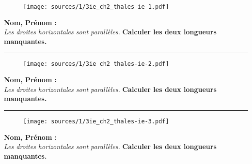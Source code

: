 \documentclass[12pt]{article}
\newcommand{\horrule}[1]{\rule{\linewidth}{#1}}
\begin{document}

\begin{multicols}{3}

  \begin{figure}[H]
    \centering
    \texttt{[image: sources/1/3ie\_ch2\_thales-ie-1.pdf]}
  \end{figure}

\textbf{Nom, Prénom :}\\
\textit{Les droites horizontales sont parallèles.} \textbf{Calculer les deux longueurs manquantes.}

\end{multicols}

\vspace{1cm}
\horrule{1px}
\vspace{1cm}

\begin{multicols}{3}

  \begin{figure}[H]
    \centering
    \texttt{[image: sources/1/3ie\_ch2\_thales-ie-2.pdf]}
  \end{figure}

\textbf{Nom, Prénom :}\\
\textit{Les droites horizontales sont parallèles.} \textbf{Calculer les deux longueurs manquantes.}

\end{multicols}

\vspace{1cm}
\horrule{1px}
\vspace{1cm}

\begin{multicols}{3}

  \begin{figure}[H]
    \centering
    \texttt{[image: sources/1/3ie\_ch2\_thales-ie-3.pdf]}
  \end{figure}

\textbf{Nom, Prénom :}\\
\textit{Les droites horizontales sont parallèles.} \textbf{Calculer les deux longueurs manquantes.}

\end{multicols}
\end{document}
